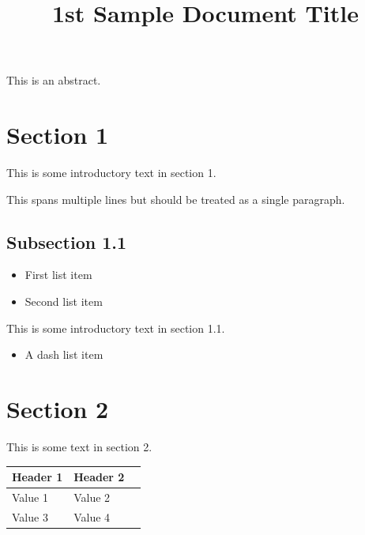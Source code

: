 \documentclass[11pt,a4paper]{article}
\title{1st Sample Document Title}
\begin{document}
\maketitle

This is an abstract.

\section{Section 1}

This is some introductory text in section 1.

This spans multiple lines but should be treated as a single paragraph.

\subsection{Subsection 1.1}

\begin{itemize}
\item First list item
\item Second list item
\end{itemize}

This is some introductory text in section 1.1.

\begin{itemize}
\item A dash list item
\end{itemize}

\section{Section 2}

This is some text in section 2.

\begin{table}[h]
\begin{tabular}{|l|l|l|}
\hline
Header 1 & Header 2 &  \\ \hline
Value 1 & Value 2 &  \\ \hline
Value 3 & Value 4 &  \\ \hline
\end{tabular}
\end{table}
\end{document}

